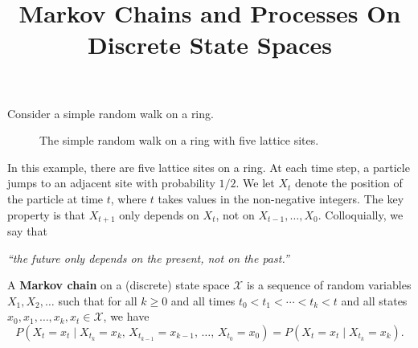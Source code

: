 \documentclass{ximera}
\title{Markov Chains and Processes On Discrete State Spaces}
\begin{document}
\begin{abstract}
\end{abstract}
\maketitle

Consider a simple random walk on a ring.
\vspace{1cm}

\begin{figure}[h]
\begin{center}

\caption{The simple random walk on a ring with five lattice sites.}
\label{markov-ring}
\end{center}
\end{figure}

In this example, there are five lattice sites on a ring. At each time step, a particle jumps to an adjacent
site with probability $1/2$. We let $X_t$ denote the position of the particle at time $t$, where $t$ takes
values in the non-negative integers. The key property is that $X_{t+1}$ only depends on $X_t$, not on
$X_{t-1}, \ldots, X_0$. Colloquially, we say that

\begin{center}
\textit{``the future only depends on the present, not on the past.''}
\end{center}

\begin{definition}
A \textbf{Markov chain} on a (discrete) state space $\mathcal{X}$ is a sequence of random variables
$X_1, X_2, \ldots$ such that for all $k \geq 0$ and all times $t_0 < t_1 < \cdots < t_k < t$ and all states
$x_0, x_1, \ldots, x_k, x_t \in \mathcal{X}$, we have
\[
P(X_t = x_t \mid X_{t_k} = x_k,\, X_{t_{k-1}} = x_{k-1},\, \ldots,\, X_{t_0} = x_0)
= P(X_t = x_t \mid X_{t_k} = x_k).
\]
\end{definition}
\end{document}
